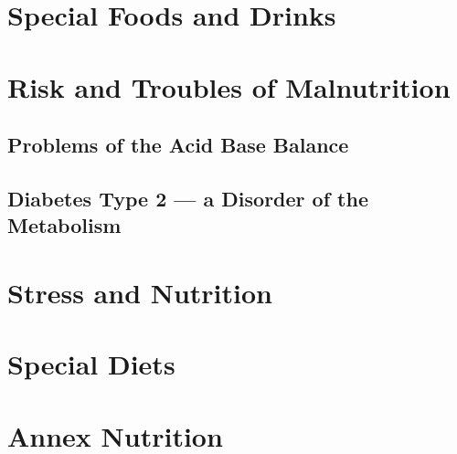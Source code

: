 \documentclass[../main.tex]{subfiles}
\begin{document}


\chapter{Special Foods and Drinks}\label{SpecialFoods} 



\chapter{Risk and Troubles of Malnutrition}

\section{Problems of the Acid Base Balance}


\section{Diabetes Type 2 --- a Disorder of the Metabolism}



\chapter{Stress and Nutrition}



\chapter{Special Diets}



\chapter{Annex Nutrition}








\end{document}
